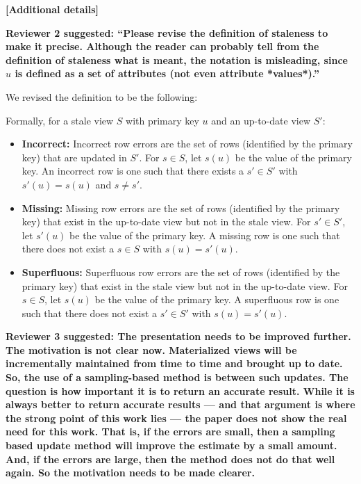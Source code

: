 \vspace{2.0em}

\textbf{[Additional details]}

\textbf{Reviewer 2 suggested: “Please revise the definition of staleness to make it precise. Although the reader can probably tell from the definition of staleness what is meant, the notation is misleading, since $u$ is defined as a set of attributes (not even attribute *values*).”}

We revised the definition to be the following:

Formally, for a stale view $S$ with primary key $u$ and an up-to-date view $S'$:
\begin{itemize}[noitemsep] \sloppy
	\item \textbf{Incorrect: } Incorrect row errors are the set of rows (identified by the primary key) that are updated in $S'$. For $s \in S$, let $s(u)$ be the value of the primary key. An incorrect row is one such that there exists a $s' \in S'$ with $s'(u) = s(u)$ and $s \ne s'$.
	\item \textbf{Missing: } Missing row errors are the set of rows (identified by the primary key) that exist in the up-to-date view but not in the stale view. For $s' \in S'$, let $s'(u)$ be the value of the primary key. A missing row is one such that there does not exist a $s \in S$ with $s(u) = s'(u)$.
	\item \textbf{Superfluous: } Superfluous row errors are the set of rows (identified by the primary key) that exist in the stale view but not in the up-to-date view. For $s \in S$, let $s(u)$ be the value of the primary key. A superfluous row is one such that there does not exist a $s' \in S'$ with $s(u) = s'(u)$.
\end{itemize}

\vspace{1.5em}

\textbf{Reviewer 3 suggested: The presentation needs to be improved further. The motivation is not clear now. Materialized views will be incrementally maintained from time to time and brought up to date. So, the use of a sampling-based method is between such updates. The question is how important it is to return an accurate result. While it is always better to return accurate results --- and that argument is where the strong point of this work lies --- the paper does not show the real need for this work. That is, if the errors are small, then a sampling based update method will improve the estimate by a small amount. And, if the errors are large, then the method does not do that well again. So the motivation needs to be made clearer.}

